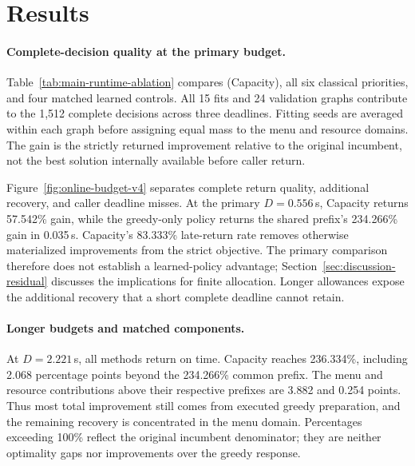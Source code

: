 \section{Results}
\label{sec:results-residual}

\paragraph{Complete-decision quality at the primary budget.}
Table~\ref{tab:main-runtime-ablation} compares \method{} (Capacity), all six
classical priorities, and four matched learned controls. All 15 fits and
24 validation graphs contribute to the 1,512 complete decisions across
three deadlines. Fitting seeds are averaged within each graph before
assigning equal mass to the menu and resource domains. The gain is the
strictly returned improvement relative to the original incumbent, not the
best solution internally available before caller return.

Figure~\ref{fig:online-budget-v4} separates complete return quality,
additional recovery, and caller deadline misses. At the primary
$D=0.556$\,s, Capacity returns 57.542\% gain, while the greedy-only
policy returns the shared prefix's 234.266\% gain in 0.035\,s.
Capacity's 83.333\% late-return rate removes otherwise materialized
improvements from the strict objective. The primary comparison therefore
does not establish a learned-policy advantage; Section~\ref{sec:discussion-residual}
discusses the implications for finite allocation. Longer allowances expose
the additional recovery that a short complete deadline cannot retain.




\paragraph{Longer budgets and matched components.}
At $D=2.221$\,s, all methods return on time. Capacity reaches 236.334\%,
including 2.068 percentage points beyond the 234.266\% common prefix.
The menu and resource contributions above their respective prefixes are
3.882 and 0.254 points. Thus most total improvement still comes from
executed greedy preparation, and the remaining recovery is concentrated
in the menu domain. Percentages exceeding 100\% reflect the original
incumbent denominator; they are neither optimality gaps nor improvements
over the greedy response.

